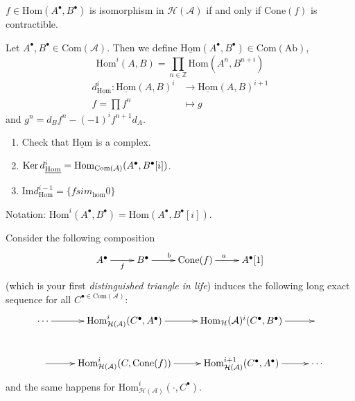 \begin{exercise}
\label{dcos-label-005}
$f \in \text{Hom}(A^{\bullet},B^{\bullet})$
is isomorphism in $\mathcal{H}(\mathcal{A})$
if and only if $\text{Cone}(f)$ is
contractible.
\end{exercise}

\begin{definition}
\label{definition-Hom-of-complexes}
Let  $A^{\bullet},B^{\bullet}\in
\text{Com}(\mathcal{A})$. Then we define
$\underline{\text{Hom}}(A^{\bullet},
B^{\bullet})
\in \text{Com}(\text{Ab})$,
$$
\text{Hom}^i(A,B)=\prod_{n \in
\mathbb{Z}}\text{Hom}(A^n,B^{n+i})
$$
$$
\begin{aligned}
d^i_{\underline{\text{Hom}}}:
\underline{\text{Hom}}(A,B)^i
&\longrightarrow
\underline{\text{Hom}}(A,B)^{i+1} \\
f=\prod f^n &\longmapsto g
\end{aligned}
$$
and $g^n=d_Bf^n-(-1)^i f^{n+1}d_A$.
\end{definition}

\begin{exercise}
\label{exercise-Hom}
\begin{enumerate}
\item Check that $\underline{\text{Hom}}$ is
a complex.
\item $\mathop{\mathrm{Ker}}
d^i_{\underline{\text{Hom}}}
=\text{Hom}_{\text{Com}(\mathcal{A})
}(A^{\bullet},B^{\bullet}[i])$.
\item
$\text{Im}d^{i-1}_{\text{Hom}}=
\{fsim_{\text{hom}}0\}$
\end{enumerate}
\end{exercise}

Notation:
$\text{Hom}^i(A^{\bullet},B^{\bullet})=
\text{Hom}(A^{\bullet},B^{\bullet}[i])$.

\begin{lemma}
\label{lemma-cone-long-exact-sequence}
Consider the following composition
$$
\xymatrix{
A^\bullet\ar[r]_f&  B^{\bullet}\ar[r]^b&
\text{Cone}(f)\ar[r]^a &
A^{\bullet}[1]
}
$$
(which is your first {\it distinguished
triangle in life}) induces the following long
exact sequence for all $C^{\bullet \in
\text{Com}(\mathcal{A})}$:
$$
\xymatrix{
\cdots\ar[r]
&\text{Hom}^i_{\mathcal{H}(\mathcal{A})
}(C^{\bullet},A^{\bullet})\ar[r]
&\text{Hom}_{\mathcal{H}}(\mathcal{A})
^i(C^{\bullet},B^{\bullet})\ar[r]&\\
\ar[r]&\text{Hom}^i_{\mathcal{H}(\mathcal{A})
}(C,\text{Cone}(f))\ar[r]
&\text{Hom}^{i+1}_{\mathcal{H}(\mathcal{A})
}(C^{\bullet},A^{\bullet})\ar[r]
&\cdots
}
$$
and the same happens for
$\text{Hom}^i_{\mathcal{H}(\mathcal{A})
}(\cdot,C^{\bullet})$.
\end{lemma}

